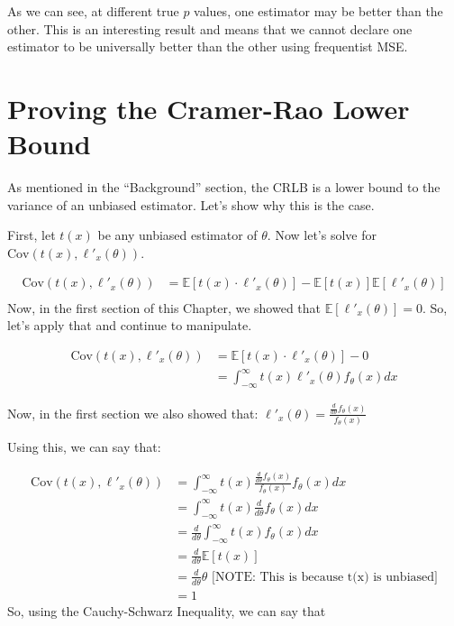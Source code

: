 \documentclass[
  letterpaper,
  DIV=11,
  numbers=noendperiod]{scrreprt}
\begin{document}
As we can see, at different true \(p\) values, one estimator may be
better than the other. This is an interesting result and means that we
cannot declare one estimator to be universally better than the other
using frequentist MSE.

\section{Proving the Cramer-Rao Lower
Bound}\label{proving-the-cramer-rao-lower-bound}

As mentioned in the ``Background'' section, the CRLB is a lower bound to
the variance of an unbiased estimator. Let's show why this is the case.

First, let \(t(x)\) be any unbiased estimator of \(\theta\). Now let's
solve for \(\text{Cov}(t(x), \ell'_x(\theta))\).

\[
\begin{aligned}
\text{Cov}(t(x), \ell'_x(\theta)) &= \mathbb{E}[t(x) \cdot \ell'_x(\theta)] - \mathbb{E}[t(x)] \mathbb{E}[\ell'_x(\theta)] \\
\end{aligned}
\] Now, in the first section of this Chapter, we showed that
\(\mathbb{E}[\ell'_x(\theta)] = 0\). So, let's apply that and continue
to manipulate.

\[
\begin{aligned}
\text{Cov}(t(x), \ell'_x(\theta)) &= \mathbb{E}[t(x) \cdot \ell'_x(\theta)] - 0 \\
&= \int_{-\infty}^\infty t(x) \ell'_x(\theta) f_\theta(x) dx
\end{aligned}
\]

Now, in the first section we also showed that:
\(\ell'_x(\theta) = \frac{\frac{d}{d \theta} f_\theta(x)}{f_\theta(x)}\)

Using this, we can say that:

\[
\begin{aligned}
\text{Cov}(t(x), \ell'_x(\theta)) &= \int_{-\infty}^\infty t(x) \frac{\frac{d}{d \theta} f_\theta(x)}{f_\theta(x)} f_\theta(x) dx \\
&= \int_{-\infty}^\infty t(x) \frac{d}{d \theta} f_\theta(x) dx \\
&= \frac{d}{d \theta}\int_{-\infty}^\infty t(x)  f_\theta(x) dx \\
&= \frac{d}{d \theta}\mathbb{E}[t(x)] \\
&= \frac{d}{d \theta} \theta \text{ [NOTE: This is because t(x) is unbiased]} \\
&= 1
\end{aligned}
\] So, using the Cauchy-Schwarz Inequality, we can say that
\end{document}
